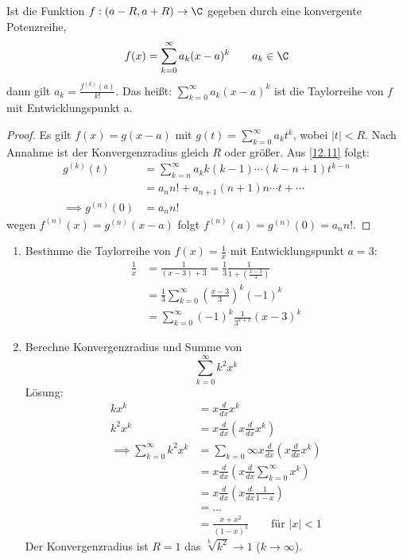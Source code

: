 \documentclass[a4paper,10pt]{scrbook}
\begin{document}
\begin{kor}
\label{12.12}
Ist die Funktion $f:(a-R,a+R)\to \C$ gegeben durch eine konvergente Potenzreihe,
\[
f(x)=\sum_{k=0}^\infty a_k(x-a)^k \qquad a_k\in\C
\]
dann gilt $a_k=\frac{f^{(k)}(a)}{k!}$.
Das heißt: $\sum_{k=0}^\infty a_k(x-a)^k$ ist die Taylorreihe von $f$ mit Entwicklungspunkt a.
\begin{proof}
Es gilt $f(x)=g(x-a)$ mit $g(t)=\sum_{k=0}^\infty a_kt^k$, wobei $|t|<R$.
Nach Annahme ist der Konvergenzradius gleich $R$ oder größer.
Aus \ref{12.11} folgt:
\begin{align*}
g^{(k)}(t)&=\sum_{k=n}^\infty a_kk(k-1)\dotsb(k-n+1)t^{k-n}\\
&=a_nn!+a_{n+1}(n+1)n\dotsb t + \dotsb\\
\implies g^{(n)}(0)&=a_nn!
\end{align*}
wegen $f^{(n)}(x)=g^{(n)}(x-a)$ folgt $f^{(n)}(a)=g^{(n)}(0)=a_nn!$.
\end{proof}
\begin{ex*}
\begin{enumerate}
\item Bestimme die Taylorreihe von $f(x)=\frac 1x$ mit Entwicklungspunkt $a=3$:
\begin{align*}
\frac 1x&=\frac 1{(x-3)+3}=\frac 13 \frac 1{1+\left(\frac {x-3}3\right)}\\
&=\frac 13 \sum_{k=0}^\infty\left(\frac {x-3}3\right)^k(-1)^k\\
&=\sum_{k=0}^\infty(-1)^k\frac 1{3^{k+1}}(x-3)^k
\end{align*}
\item Berechne Konvergenzradius und Summe von
\[
\sum_{k=0}^\infty k^2x^k
\]
Lösung:
\begin{align*}
kx^k &= x\frac d{dx}x^k\\
k^2x^k &= x \frac d{dx}\left(x\frac d{dx}x^k\right)\\
\implies \sum_{k=0}^\infty k^2x^k &= \sum_{k=0}\infty x\frac d{dx}\left(x\frac d{dx}x^k\right)\\
&= x\frac d{dx}\left(x\frac d{dx}\sum_{k=0}^\infty x^k\right)\\
&= x\frac d{dx}\left(x\frac d{dx}\frac 1{1-x}\right)\\
&= …\\
&= \frac {x+x^2}{(1-x)^3} \qquad \text{für } |x|<1
\end{align*}
Der Konvergenzradius ist $R=1$ das $\sqrt[k]{k^2}\to 1$ ($k\to \infty$).
\end{enumerate}
\end{ex*}
\end{kor}
\end{document}
